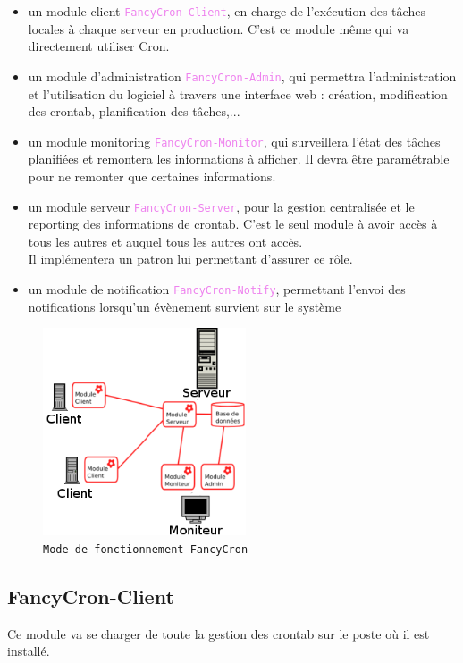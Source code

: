 \documentclass{bouygues-fr}
\begin{document}
\begin{itemize}
\item un module client \textcolor{violet}{\texttt{FancyCron-Client}}, en charge de l'exécution des tâches locales à chaque serveur en production. C'est ce module même qui va directement utiliser Cron.
\item un module d'administration \textcolor{violet}{\texttt{FancyCron-Admin}}, qui permettra l'administration et l'utilisation du logiciel à travers une interface web : création, modification des crontab, planification des tâches,...
\item un module monitoring \textcolor{violet}{\texttt{FancyCron-Monitor}}, qui surveillera l'état des tâches planifiées et remontera les informations à afficher. Il devra être paramétrable pour ne remonter que certaines informations.
\item un module serveur \textcolor{violet}{\texttt{FancyCron-Server}}, pour la gestion centralisée et le reporting des informations de crontab. C'est le seul module à avoir accès à tous les autres et auquel tous les autres ont accès. \\
  Il implémentera un patron lui permettant d'assurer ce rôle.
\item un module de notification \textcolor{violet}{\texttt{FancyCron-Notify}}, permettant l'envoi des notifications lorsqu'un évènement survient sur le système
\end{itemize}
 \begin{figure}[H]
    \begin{center}
      \includegraphics[width=6cm]{Architecture.png}
    \end{center}
    \caption{\scriptsize \texttt{Mode de fonctionnement FancyCron}}
  \end{figure}

\subsection{FancyCron-Client}
Ce module va se charger de toute la gestion des crontab sur le poste où il est installé.
\end{document}
